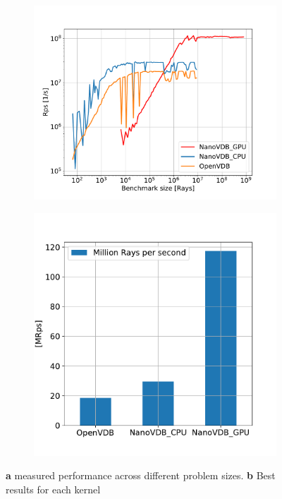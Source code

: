 \begin{figure}[h]
    \begin{subfigure}{0.5\textwidth}
    \includegraphics[width=1\linewidth]{res/results.pdf} 
    \caption{}
    
\end{subfigure}
    \begin{subfigure}{0.4\textwidth}
    \includegraphics[width=1\linewidth]{res/barplot.pdf}
    \caption{}
\end{subfigure}

\caption{\textbf{a} measured performance across different problem sizes. \textbf{b} Best results for each kernel}
\label{fig:results}
\end{figure}


\nocite{openvdb}
\nocite{nanovdb}
\printbibliography